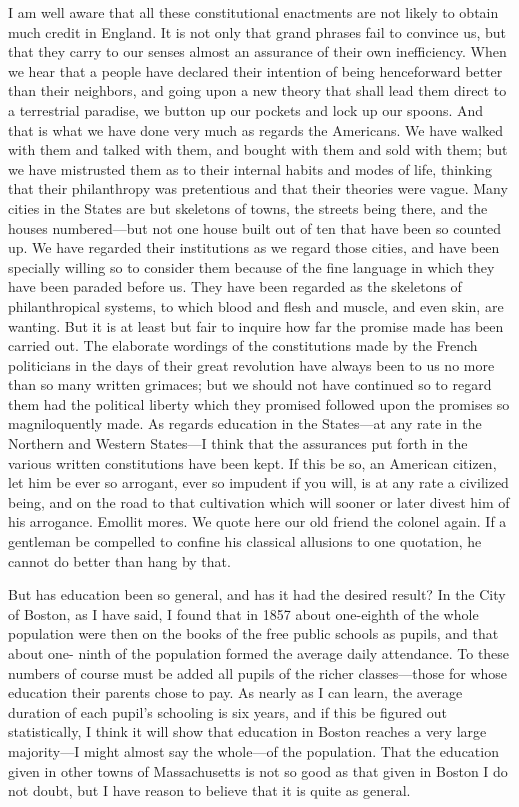 I am well aware that all these constitutional enactments are not
likely to obtain much credit in England.  It is not only that grand
phrases fail to convince us, but that they carry to our senses
almost an assurance of their own inefficiency.  When we hear that a
people have declared their intention of being henceforward better
than their neighbors, and going upon a new theory that shall lead
them direct to a terrestrial paradise, we button up our pockets and
lock up our spoons.  And that is what we have done very much as
regards the Americans.  We have walked with them and talked with
them, and bought with them and sold with them; but we have
mistrusted them as to their internal habits and modes of life,
thinking that their philanthropy was pretentious and that their
theories were vague.  Many cities in the States are but skeletons
of towns, the streets being there, and the houses numbered---but not
one house built out of ten that have been so counted up.  We have
regarded their institutions as we regard those cities, and have
been specially willing so to consider them because of the fine
language in which they have been paraded before us.  They have been
regarded as the skeletons of philanthropical systems, to which
blood and flesh and muscle, and even skin, are wanting.  But it is
at least but fair to inquire how far the promise made has been
carried out.  The elaborate wordings of the constitutions made by
the French politicians in the days of their great revolution have
always been to us no more than so many written grimaces; but we
should not have continued so to regard them had the political
liberty which they promised followed upon the promises so
magniloquently made.  As regards education in the States---at any
rate in the Northern and Western States---I think that the
assurances put forth in the various written constitutions have been
kept.  If this be so, an American citizen, let him be ever so
arrogant, ever so impudent if you will, is at any rate a civilized
being, and on the road to that cultivation which will sooner or
later divest him of his arrogance.  Emollit mores.  We quote here
our old friend the colonel again.  If a gentleman be compelled to
confine his classical allusions to one quotation, he cannot do
better than hang by that.

But has education been so general, and has it had the desired
result?  In the City of Boston, as I have said, I found that in
1857 about one-eighth of the whole population were then on the
books of the free public schools as pupils, and that about one-
ninth of the population formed the average daily attendance.  To
these numbers of course must be added all pupils of the richer
classes---those for whose education their parents chose to pay.  As
nearly as I can learn, the average duration of each pupil's
schooling is six years, and if this be figured out statistically, I
think it will show that education in Boston reaches a very large
majority---I might almost say the whole---of the population.  That
the education given in other towns of Massachusetts is not so good
as that given in Boston I do not doubt, but I have reason to
believe that it is quite as general.

